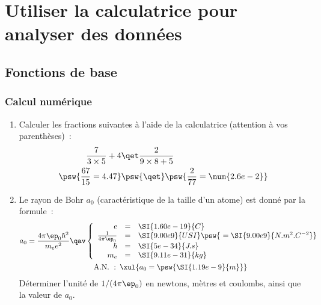 \documentclass[a4paper, 12pt, garamond]{book}
\begin{document}
\setcounter{chapter}{3}


\chapter{Utiliser la calculatrice pour analyser des donn\'ees}

\section{Fonctions de base}

\subsection{Calcul num\'erique}

\begin{enumerate}

	\item Calculer les fractions suivantes à l'aide de la calculatrice (attention
	      à vos parenthèses)~:
	      \begin{align*}
		      \frac{7}{3\times 5}+4
		       & \qet
		      \frac{2}{9\times8 + 5} \\
		      \psw{ \frac{67}{15} = 4.47 }
		       & \psw{ \qet }
		      \psw{ \frac{2}{77} = \num{2.6e-2} }
	      \end{align*}
	\item Le rayon de Bohr $a_0$ (caractéristique de la taille d'un atome) est
	      donné par la formule~:
	      \begin{gather*}
		      a_0 = \frac{4\pi \ep_0 \hbar^2}{m_ee^2}
		      \qav
		      \left\{
		      \begin{array}{rcl}
			      e                   & = & \SI{1.60e-19}{C}
			      \\
			      \frac{1}{4\pi\ep_0} & = & \SI{9.00e9}{USI} \psw{~
			      = \SI{9.00e9}{N.m^{2}.C^{-2}}
			      }
			      \\
			      \hbar               & = & \SI{5e-34}{J.s}
			      \\
			      m_e                 & = & \SI{9.11e-31}{kg}
		      \end{array}
		      \right.\\
		      \mathrm{A.N.~:}\enskip
		      \xul{a_0 = \psw{\SI{1.19e-9}{m}}
		      }
	      \end{gather*}
	      Déterminer l'unité de $1/(4\pi\ep_0)$ en newtons, mètres et
	      coulombs, ainsi que la valeur de $a_0$.
	      \vspace{-20pt}
\end{enumerate}
\end{document}
